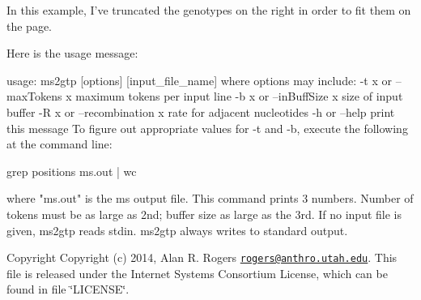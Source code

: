 In this example, I've truncated the genotypes on the right in order to fit them on the page.

Here is the usage message\+: \begin{DoxyVerb}usage: ms2gtp [options] [input_file_name]
   where options may include:
   -t \<x\> or --maxTokens \<x\>
      maximum tokens per input line
   -b \<x\> or --inBuffSize \<x\>
      size of input buffer
   -R \<x\> or --recombination \<x\>
      rate for adjacent nucleotides
   -h     or --help
      print this message
  To figure out appropriate values for -t and -b, execute the
  following at the command line:

     grep positions ms.out | wc

  where "ms.out" is the ms output file. This command prints 3 numbers.
  Number of tokens must be as large as 2nd; buffer size as large as the
  3rd. If no input file is given, ms2gtp reads stdin. ms2gtp
  always writes to standard output.
\end{DoxyVerb}


\begin{DoxyCopyright}{Copyright}
Copyright (c) 2014, Alan R. Rogers \href{mailto:rogers@anthro.utah.edu}{\tt rogers@anthro.\+utah.\+edu}. This file is released under the Internet Systems Consortium License, which can be found in file \char`\"{}\+L\+I\+C\+E\+N\+S\+E\char`\"{}. 
\end{DoxyCopyright}
